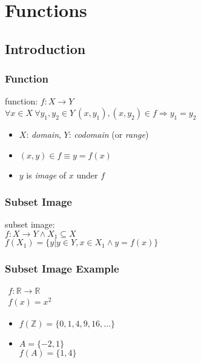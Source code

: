 \documentclass[dvipsnames]{beamer}
\begin{document}
\section{Functions}

\subsection{Introduction}

\begin{frame}
  \frametitle{Function}

  \begin{definition}
    \alert{function}: $f: X \rightarrow Y$\\
    $\forall x \in X~\forall y_1,y_2 \in Y~
      (x,y_1),(x,y_2) \in f \Rightarrow y_1=y_2$
  \end{definition}

  \pause
  \medskip
  \begin{itemize}
    \item $X$: \emph{domain}, $Y$: \emph{codomain} (or \emph{range})

    \pause
    \medskip
    \item $(x,y) \in f \equiv y = f(x)$
    \item $y$ is \emph{image} of $x$ under $f$
 \end{itemize}
\end{frame}

\begin{frame}
  \frametitle{Subset Image}

  \begin{definition}
    \alert{subset image}:\\
    $f: X \rightarrow Y \wedge X_1 \subseteq X$\\
    $f(X_1) = \{ y | y \in Y, x \in X_1 \wedge y = f(x) \}$
  \end{definition}
\end{frame}

\begin{frame}
  \frametitle{Subset Image Example}

  \begin{example}
    $\begin{array}{l}
      f: \mathbb{R} \rightarrow \mathbb{R}\\
      f(x) = x^2
    \end{array}$

    \pause
    \medskip
    \begin{itemize}
      \item $f(\mathbb{Z}) = \{0,1,4,9,16,\dots\}$

      \pause
      \medskip
      \item $A = \{-2,1\}$\\
        $f(A) = \{1,4\}$
    \end{itemize}
  \end{example}
\end{frame}
\end{document}

